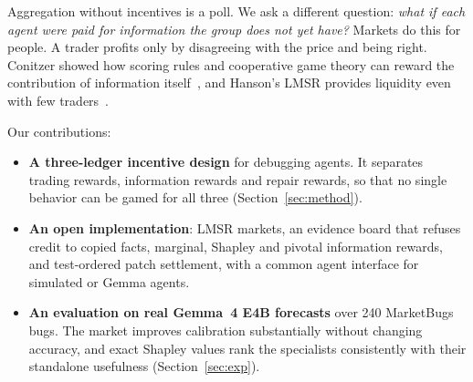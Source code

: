 \documentclass[10pt]{article}
\begin{document}
Aggregation without incentives is a poll. We ask a different question: \emph{what if each agent were paid for information the group does not yet have?} Markets do this for people. A trader profits only by disagreeing with the price and being right. Conitzer showed how scoring rules and cooperative game theory can reward the contribution of information itself~\cite{conitzer2009}, and Hanson's LMSR provides liquidity even with few traders~\cite{hanson2003}.

Our contributions:
\begin{itemize}\setlength{\itemsep}{1pt}
\item \textbf{A three-ledger incentive design} for debugging agents. It separates trading rewards, information rewards and repair rewards, so that no single behavior can be gamed for all three (Section~\ref{sec:method}).
\item \textbf{An open implementation}: LMSR markets, an evidence board that refuses credit to copied facts, marginal, Shapley and pivotal information rewards, and test-ordered patch settlement, with a common agent interface for simulated or Gemma agents.
\item \textbf{An evaluation on real Gemma~4 E4B forecasts} over 240 MarketBugs bugs. The market improves calibration substantially without changing accuracy, and exact Shapley values rank the specialists consistently with their standalone usefulness (Section~\ref{sec:exp}).
\end{itemize}
\end{document}
